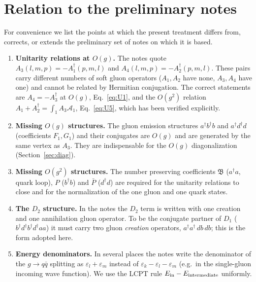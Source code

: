 \documentclass[11pt]{article}
\newcommand{\eps}{\varepsilon}
\newcommand{\dg}{\dagger}
\begin{document}
\section{Relation to the preliminary notes}
\label{app:diff}

For convenience we list the points at which the present treatment differs from, corrects, or
extends the preliminary set of notes on which it is based.

\begin{enumerate}
\item {\bf Unitarity relations at $O(g)$.} The notes quote
$A_3(l,m,p)=-A_1^\dg(p,m,l)$ and $A_4(l,m,p)=-A_2^\dg(p,m,l)$. These pairs carry different numbers
of soft gluon operators ($A_1,A_2$ have none, $A_3,A_4$ have one) and cannot be related by
Hermitian conjugation. The correct statements are $A_4=-A_3^\dg$ at $O(g)$,
Eq.~\eqref{eq:U1}, and the $O(g^2)$ relation $A_1+A_2^\dg=\int_1 A_3\mathcal A_1$,
Eq.~\eqref{eq:U5}, which has been verified explicitly.

\item {\bf Missing $O(g)$ structures.} The gluon emission structures $a^\dg b^\dg b$ and
$a^\dg d^\dg d$ (coefficients $F_1,G_1$) and their conjugates are $O(g)$ and are generated by the
same vertex as $A_3$. They are indispensable for the $O(g)$ diagonalization
(Section~\ref{sec:diag}).

\item {\bf Missing $O(g^2)$ structures.} The number preserving coefficients $\mathfrak B$
($a^\dg a$, quark loop), $P$ ($b^\dg b$) and $\bar P$ ($d^\dg d$) are required for the unitarity
relations to close and for the normalization of the one gluon and one quark states.

\item {\bf The $D_2$ structure.} In the notes the $D_2$ term is written with one creation and one
annihilation gluon operator. To be the conjugate partner of $D_1$ ($b^\dg d^\dg b^\dg d^\dg aa$) it
must carry two gluon {\em creation} operators, $a^\dg a^\dg\,d b\,d b$; this is the form adopted
here.

\item {\bf Energy denominators.} In several places the notes write the denominator of the
$g\to q\bar q$ splitting as $\eps_l+\eps_m$ instead of $\eps_k-\eps_l-\eps_m$ (e.g.\ in the
single-gluon incoming wave function). We use the LCPT rule $E_{\rm in}-E_{\rm intermediate}$
uniformly.


\end{enumerate}
\end{document}
